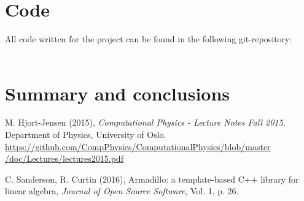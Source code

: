 \documentclass[12pt, a4paper]{article}
\begin{document}
\section{Code}

All code written for the project can be found in the following git-repository:  \vspace{0.5cm} \\ 
 \vspace{0.5cm} \\ 


\section{Summary and conclusions}

\begin{thebibliography}{40}

 M. Hjort-Jensen (2015), \textit{Computational Physics - Lecture Notes Fall 2015}, 
Department of Physics, University of Oslo. \\ 
\href{https://github.com/CompPhysics/ComputationalPhysics/blob/master/doc/Lectures/lectures2015.pdf}
{https://github.com/CompPhysics/ComputationalPhysics/blob/master\\/doc/Lectures/lectures2015.pdf}

 C. Sanderson, R. Curtin (2016), Armadillo: a template-based C++ library for linear 
algebra, \textit{Journal of Open Source Software}, Vol. 1, p. 26.  

\end{thebibliography} 
\end{document}
